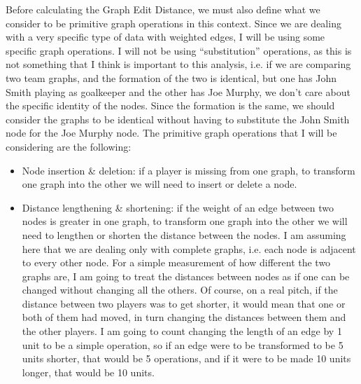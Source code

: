 \documentclass[a4paper,11pt]{article}
\begin{document}
Before calculating the Graph Edit Distance, we must also define what we consider to be primitive graph operations in this 
context.
Since we are dealing with a very specific type of data with weighted edges, I will be using some specific graph operations. 
I will not be using ``substitution'' operations, as this is not something that I think is important to this analysis, i.e. 
if we are comparing two team graphs, and the formation of the two is identical, but one has John Smith playing as goalkeeper
and the other has Joe Murphy, we don't care about the specific identity of the nodes. 
Since the formation is the same, we should consider the graphs to be identical without having to substitute the John Smith 
node for the Joe Murphy node.
The primitive graph operations that I will be considering are the following:
\begin{itemize}
    \item   Node insertion \& deletion: if a player is missing from one graph, to transform one graph into the other we 
            will need to insert or delete a node.

    \item   Distance lengthening \& shortening: if the weight of an edge between two nodes is greater in one graph, to 
            transform one graph into the other we will need to lengthen or shorten the distance between the nodes.
            I am assuming here that we are dealing only with complete graphs, i.e. each node is adjacent to every other node.  
            For a simple measurement of how different the two graphs are, I am going to treat the distances between nodes 
            as if one can be changed without changing all the others. 
            Of course, on a real pitch, if the distance between two players was to get shorter, it would mean that one or both 
            of them had moved, in turn changing the distances between them and the other players.
            I am going to count changing the length of an edge by 1 unit to be a simple operation, so if an edge were 
            to be transformed to be 5 units shorter, that would be 5 operations, and if it were to be made 10 units longer,
            that would be 10 units. 
\end{itemize}
\end{document}
